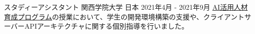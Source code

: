 \begin{cventries}
  \cventry
    {スタディーアシスタント} %
    {関西学院大学} %
    {日本} %
    {2021年4月 - 2021年9月} %
    {
      \href{https://www.kwansei.ac.jp/education/ai}{AI活用人材育成プログラム}の授業において、学生の開発環境構築の支援や、クライアントサーバーAPIアーキテクチャに関する個別指導を行いました。
    }


\end{cventries}
